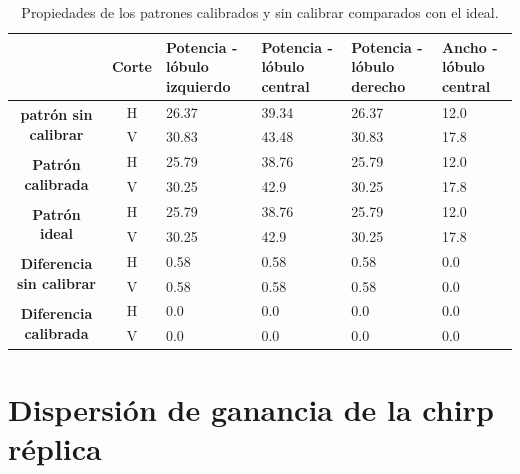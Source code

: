 \begin{table}[H]
  \footnotesize
  \centering
  \begin{tabular}{|c|c|p{2cm}|p{2cm}|p{2cm}|p{2cm}|}
    \cline{2-6}
    \multicolumn{1}{c|}{} & \textbf{Corte} & \textbf{Potencia - lóbulo izquierdo} & \textbf{Potencia - lóbulo central} &
    \textbf{Potencia - lóbulo derecho} & \textbf{Ancho - lóbulo central} \tabularnewline\hline
    \multirow{2}{*}{\textbf{patrón sin calibrar}} & H & 26.37 & 39.34 & 26.37 & 12.0 \tabularnewline\cline{2-6}
     & V & 30.83 & 43.48 & 30.83 & 17.8 \tabularnewline\hline
    \multirow{2}{*}{\textbf{Patrón calibrada}} & H & 25.79 & 38.76 & 25.79 & 12.0 \tabularnewline\cline{2-6}
     & V & 30.25 & 42.9 & 30.25 & 17.8 \tabularnewline\hline
    \multirow{2}{*}{\textbf{Patrón ideal}} & H & 25.79 & 38.76 & 25.79 & 12.0 \tabularnewline\cline{2-6}
     & V & 30.25 & 42.9 & 30.25 & 17.8 \tabularnewline\hline
    \multirow{2}{*}{\textbf{Diferencia sin calibrar}} & H & 0.58 & 0.58 & 0.58 & 0.0\tabularnewline\cline{2-6}
     & V & 0.58 & 0.58 & 0.58 & 0.0 \tabularnewline\hline
    \multirow{2}{*}{\textbf{Diferencia calibrada}} & H & 0.0 & 0.0 & 0.0 & 0.0 \tabularnewline\cline{2-6}
     & V & 0.0 & 0.0 & 0.0 & 0.0 \tabularnewline\hline
  \end{tabular}
  \caption{Propiedades de los patrones calibrados y sin calibrar comparados con el ideal.}
  \label{tab:chirpErrMutual10degRow}
\end{table}


\section{Dispersión de ganancia de la chirp réplica}

